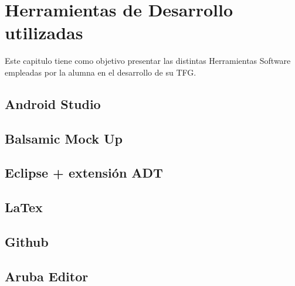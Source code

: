 %
%
%


\chapter{Herramientas de Desarrollo utilizadas} \label{chap:HerramientasSoftware}

Este capitulo tiene como objetivo presentar las distintas Herramientas Software empleadas por la alumna en el desarrollo de su TFG.

\section{Android Studio}


\section{Balsamic Mock Up}


\section{Eclipse + extensión ADT}

\section{LaTex}

\section{Github}

\section{Aruba Editor}


